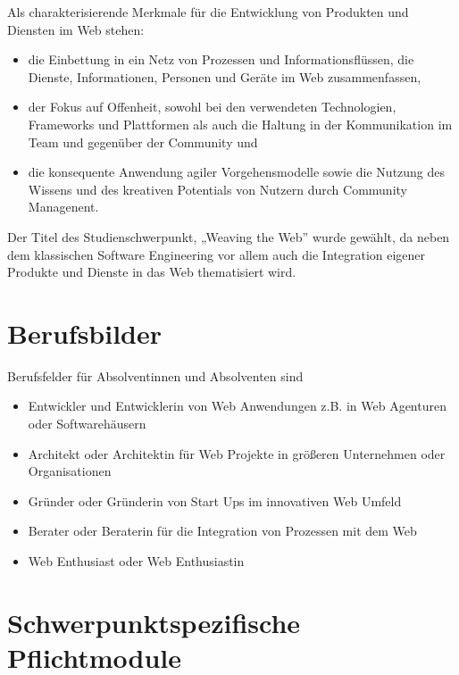 Als charakterisierende Merkmale für die Entwicklung von Produkten und
Diensten im Web stehen:

\begin{itemize}
\tightlist
\item
  die Einbettung in ein Netz von Prozessen und Informationsflüssen, die
  Dienste, Informationen, Personen und Geräte im Web zusammenfassen,
\item
  der Fokus auf Offenheit, sowohl bei den verwendeten Technologien,
  Frameworks und Plattformen als auch die Haltung in der Kommunikation
  im Team und gegenüber der Community und
\item
  die konsequente Anwendung agiler Vorgehensmodelle sowie die Nutzung
  des Wissens und des kreativen Potentials von Nutzern durch Community
  Managenent.
\end{itemize}

Der Titel des Studienschwerpunkt, „Weaving the Web'' wurde gewählt, da
neben dem klassischen Software Engineering vor allem auch die
Integration eigener Produkte und Dienste in das Web thematisiert wird.

\section*{Berufsbilder\label{/mi-2017/modulbeschreibungen-master/schwerpunkt-weaving-the-web}}\label{berufsbilderpathlabelmi-2017modulbeschreibungen-masterschwerpunkt-weaving-the-web}

Berufsfelder für Absolventinnen und Absolventen sind

\begin{itemize}
\tightlist
\item
  Entwickler und Entwicklerin von Web Anwendungen z.B. in Web Agenturen
  oder Softwarehäusern
\item
  Architekt oder Architektin für Web Projekte in größeren Unternehmen
  oder Organisationen
\item
  Gründer oder Gründerin von Start Ups im innovativen Web Umfeld
\item
  Berater oder Beraterin für die Integration von Prozessen mit dem Web
\item
  Web Enthusiast oder Web Enthusiastin
\end{itemize}

\section*{Schwerpunktspezifische
Pflichtmodule\label{/mi-2017/modulbeschreibungen-master/schwerpunkt-weaving-the-web}}\label{schwerpunktspezifische-pflichtmodulepathlabelmi-2017modulbeschreibungen-masterschwerpunkt-weaving-the-web}


